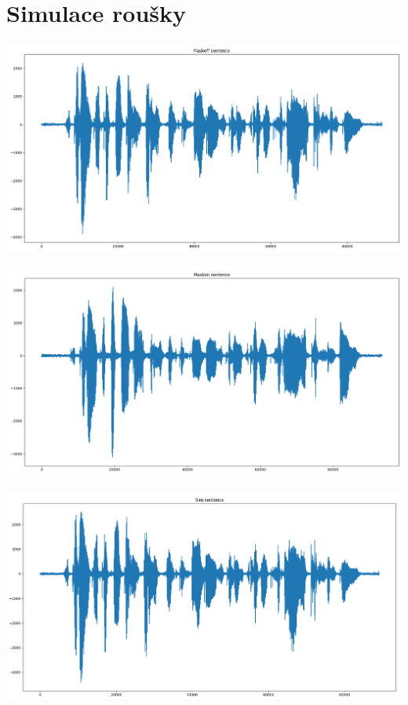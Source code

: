 \documentclass[12pt,czech]{article}
\begin{document}
\section{Simulace roušky}
\begin{center}
\hfill\includegraphics[scale=0.45]{images/Maskoff_sentence.png}\hspace*{\fill}
\end{center}
\begin{center}
\hfill\includegraphics[scale=0.45]{images/Maskon_sentence.png}\hspace*{\fill}
\end{center}
\begin{center}
\hfill\includegraphics[scale=0.45]{images/Sim_sentence.png}\hspace*{\fill}
\end{center}
\end{document}
